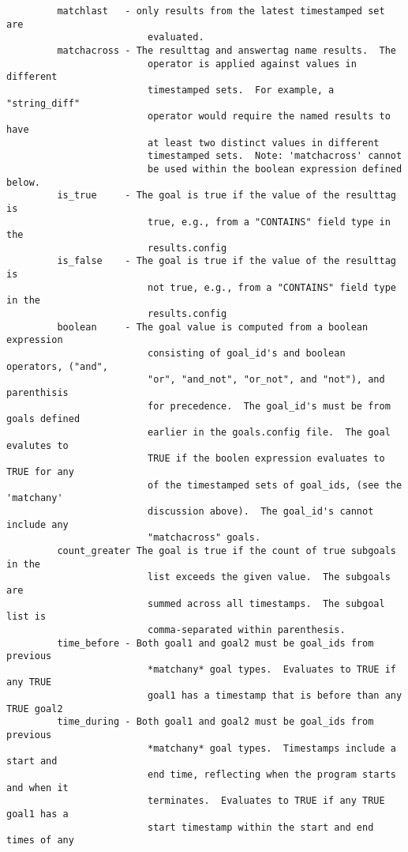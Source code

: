 \documentclass[12pt]{article}
\begin{document}
\begin{verbatim}
         matchlast   - only results from the latest timestamped set are 
                         evaluated.
         matchacross - The resulttag and answertag name results.  The 
                         operator is applied against values in different 
                         timestamped sets.  For example, a "string_diff" 
                         operator would require the named results to have 
                         at least two distinct values in different 
                         timestamped sets.  Note: 'matchacross' cannot 
                         be used within the boolean expression defined below.
         is_true     - The goal is true if the value of the resulttag is 
                         true, e.g., from a "CONTAINS" field type in the 
                         results.config
         is_false    - The goal is true if the value of the resulttag is 
                         not true, e.g., from a "CONTAINS" field type in the 
                         results.config
         boolean     - The goal value is computed from a boolean expression 
                         consisting of goal_id's and boolean operators, ("and", 
                         "or", "and_not", "or_not", and "not"), and parenthisis 
                         for precedence.  The goal_id's must be from goals defined 
                         earlier in the goals.config file.  The goal evalutes to 
                         TRUE if the boolen expression evaluates to TRUE for any
                         of the timestamped sets of goal_ids, (see the 'matchany' 
                         discussion above).  The goal_id's cannot include any 
                         "matchacross" goals.
         count_greater The goal is true if the count of true subgoals in the 
                         list exceeds the given value.  The subgoals are 
                         summed across all timestamps.  The subgoal list is 
                         comma-separated within parenthesis.
         time_before - Both goal1 and goal2 must be goal_ids from previous 
                         *matchany* goal types.  Evaluates to TRUE if any TRUE 
                         goal1 has a timestamp that is before than any TRUE goal2
         time_during - Both goal1 and goal2 must be goal_ids from previous 
                         *matchany* goal types.  Timestamps include a start and 
                         end time, reflecting when the program starts and when it 
                         terminates.  Evaluates to TRUE if any TRUE goal1 has a 
                         start timestamp within the start and end times of any 

\end{verbatim}
\end{document}
